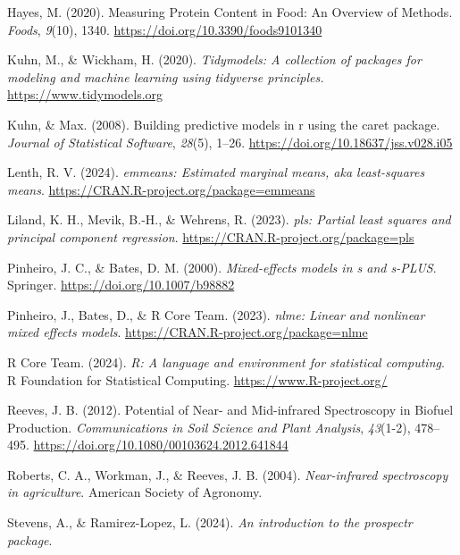 \documentclass[
]{agujournal2019}
\newlength{\cslhangindent}
\newenvironment{CSLReferences}[2] %
 {\begin{list}{}{%
  \setlength{\itemindent}{0pt}
  \setlength{\leftmargin}{0pt}
  \setlength{\parsep}{0pt}
  \ifodd #1
   \setlength{\leftmargin}{\cslhangindent}
   \setlength{\itemindent}{-1\cslhangindent}
  \fi
  \setlength{\itemsep}{#2\baselineskip}}}
 {\end{list}}
\begin{document}
\begin{CSLReferences}{1}{0}
Hayes, M. (2020). Measuring {Protein} {Content} in {Food}: {An}
{Overview} of {Methods}. \emph{Foods}, \emph{9}(10), 1340.
\url{https://doi.org/10.3390/foods9101340}

Kuhn, M., \& Wickham, H. (2020). \emph{{Tidymodels}: A collection of
packages for modeling and machine learning using tidyverse principles.}
\url{https://www.tidymodels.org}

Kuhn, \& Max. (2008). Building predictive models in r using the caret
package. \emph{Journal of Statistical Software}, \emph{28}(5), 1--26.
\url{https://doi.org/10.18637/jss.v028.i05}

Lenth, R. V. (2024). \emph{{emmeans}: Estimated marginal means, aka
least-squares means}. \url{https://CRAN.R-project.org/package=emmeans}

Liland, K. H., Mevik, B.-H., \& Wehrens, R. (2023). \emph{{pls}: Partial
least squares and principal component regression}.
\url{https://CRAN.R-project.org/package=pls}

Pinheiro, J. C., \& Bates, D. M. (2000). \emph{Mixed-effects models in s
and s-PLUS}. Springer. \url{https://doi.org/10.1007/b98882}

Pinheiro, J., Bates, D., \& R Core Team. (2023). \emph{{nlme}: Linear
and nonlinear mixed effects models}.
\url{https://CRAN.R-project.org/package=nlme}

R Core Team. (2024). \emph{{R}: A language and environment for
statistical computing}. R Foundation for Statistical Computing.
\url{https://www.R-project.org/}

Reeves, J. B. (2012). Potential of {Near}- and {Mid}-infrared
{Spectroscopy} in {Biofuel} {Production}. \emph{Communications in Soil
Science and Plant Analysis}, \emph{43}(1-2), 478--495.
\url{https://doi.org/10.1080/00103624.2012.641844}

Roberts, C. A., Workman, J., \& Reeves, J. B. (2004).
\emph{Near-infrared spectroscopy in agriculture}. American Society of
Agronomy.

Stevens, A., \& Ramirez-Lopez, L. (2024). \emph{An introduction to the
prospectr package}.


\end{CSLReferences}
\end{document}
